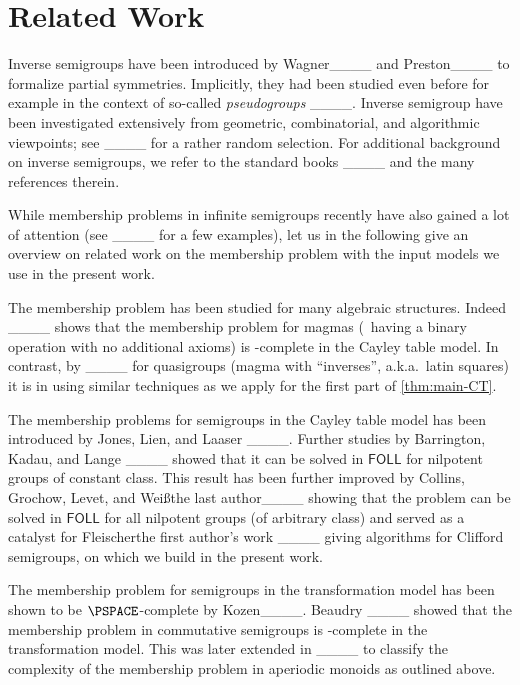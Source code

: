 \section{Related Work}
\label{sec:related-work}

Inverse semigroups have been introduced by Wagner____ and Preston____ to formalize partial symmetries. 
Implicitly, they had been studied even before for example in the context of so-called \emph{pseudogroups} ____.
Inverse semigroup have been investigated extensively from geometric, combinatorial, and algorithmic viewpoints; see \eg ____ for a rather random selection.
For additional background on inverse semigroups, we refer to the standard books ____ and the many references therein.


While membership problems in infinite semigroups recently have also gained a lot of attention (see ____ for a few examples), let us in the following give an overview on related work on the membership problem with the input models we use in the present work.




The membership problem has been studied for many algebraic structures.
Indeed ____ shows that the membership problem for magmas (\ie\ having a binary operation with no additional axioms) is \Ptime-complete in the Cayley table model.
In contrast, by ____ for quasigroups (magma with ``inverses'', a.k.a.\ latin squares) it is in \NPOLYLOGTIME using similar techniques as  we apply for the first part of \cref{thm:main-CT}. 

The membership problems for semigroups in the Cayley table model has been introduced by Jones, Lien, and Laaser ____.
Further studies by Barrington, Kadau, and Lange ____ showed that it can be solved in $\mathsf{FOLL}$ for nilpotent groups of constant class.
This result has been further improved by Collins, Grochow, Levet, and \ifAnonimous Weiß\else the last author\fi____ showing that the problem can be solved in $\mathsf{FOLL}$ for all nilpotent groups (\ie of arbitrary class) and served as a catalyst for \ifAnonimous Fleischer\else the first author\fi's work ____ giving \NPOLYLOGTIME algorithms for Clifford semigroups, on which we build in the present work.


The membership problem for semigroups in the transformation model has been shown to be $\PSPACE$-complete by Kozen____.
Beaudry ____ showed that the membership problem in commutative semigroups is \NP-complete in the transformation model.
This was later extended in ____ to classify the complexity of the membership problem in aperiodic monoids as outlined above.

